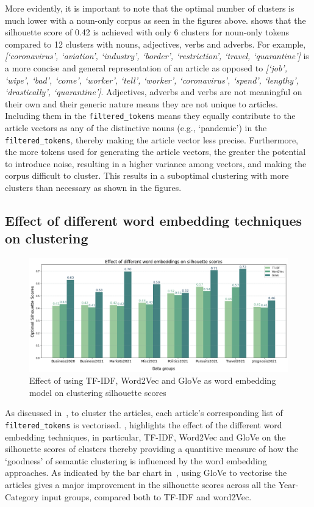 \vspace*{-1em}
More evidently, it is important to note that the optimal number of clusters is much lower with a noun-only corpus as seen in the figures above.  shows that the silhouette score of 0.42 is achieved with only 6 clusters for noun-only tokens compared to 12 clusters with nouns, adjectives, verbs and adverbs. For example, \textit{[`coronavirus', `aviation', `industry', `border', `restriction', `travel, `quarantine']} is a more concise and general representation of an article as opposed to \textit{[`job', `wipe', `bad', `come', `worker', `tell', `worker', `coronavirus', `spend', `lengthy', `drastically', `quarantine']}. Adjectives, adverbs and verbs are not meaningful on their own and their generic nature means they are not unique to articles. Including them in the \texttt{filtered\_tokens} means they equally contribute to the article vectors as any of the distinctive nouns (e.g., `pandemic') in the \texttt{filtered\_tokens}, thereby making the article vector less precise. Furthermore, the more tokens used for generating the article vectors, the greater the potential to introduce noise, resulting in a higher variance among vectors, and making the corpus difficult to cluster. This results in a suboptimal clustering with more clusters than necessary as shown in the figures.

\subsection{Effect of different word embedding techniques on clustering} \label{s:word_embeddings}

\begin{figure}[H]
\centering
\includegraphics[width=0.8\linewidth]{images/eval/word_embedding.png}
\caption{Effect of using TF-IDF, Word2Vec and GloVe as word embedding model on clustering silhouette scores}
\label{fig:word_embed}
\end{figure}
\vspace{-1em}
As discussed in~, to cluster the articles, each article's corresponding list of \texttt{filtered\_tokens} is vectorised. , highlights the effect of the different word embedding techniques, in particular, TF-IDF, Word2Vec and GloVe on the silhouette scores of clusters thereby providing a quantitive measure of how the `goodness' of semantic clustering is influenced by the word embedding approaches. As indicated by the bar chart in~, using GloVe to vectorise the articles gives a major improvement in the silhouette scores across all the Year-Category input groups, compared both to TF-IDF and word2Vec.

